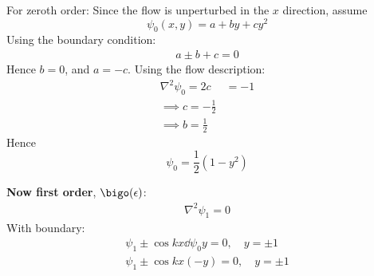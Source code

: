 \documentclass{/home/janmebows/Documents/LatexTemplates/myassignment}
\begin{document}
\begin{enumerate}
\begin{enumerate}

        For zeroth order:
        Since the flow is unperturbed in the $x$ direction, assume
        \[ \psi_0(x,y) = a + by + cy^2\]
        Using the boundary condition:
        \begin{align*}
            a \pm b + c = 0
        \end{align*}
        Hence $b=0$, and $a=-c$.
        Using the flow description:
        \begin{align*}
            \nabla^2\psi_0=2c&=-1\\
            \implies c = -\frac12\\
            \implies b = \frac12
        \end{align*}
        Hence
        \[\boxed{\psi_0 = \frac12\left(1 - y^2\right)}\]

        \textbf{Now first order}, $\bigo(\epsilon)$:
        \begin{align*}
            \nabla^2 \psi_1 = 0
        \end{align*}
        With boundary:
        \begin{align*}
            \psi_{1} \pm \cos kx \dd{\psi_0}y = 0, \quad y=\pm1\\
            \psi_{1} \pm \cos kx (-y) = 0, \quad y=\pm 1
        \end{align*}



\end{enumerate}
\end{enumerate}
\end{document}
